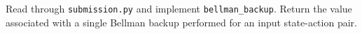 \item {}

Read through \texttt{submission.py} and implement \texttt{bellman\_backup}. Return the value associated with a single Bellman backup performed for an input state-action pair.
